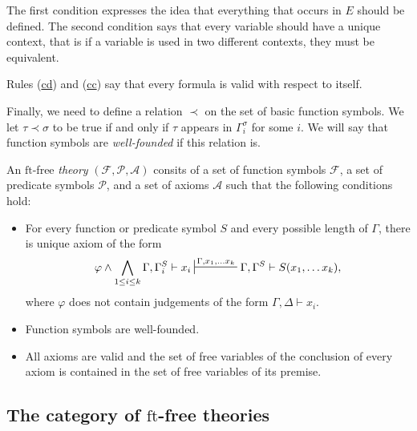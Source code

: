 \documentclass[reqno]{amsart}
\newcommand{\axref}[1]{(\hyperref[ax:#1]{#1})}
\theoremstyle{definition}
\theoremstyle{remark}
\newcommand{\fs}[1]{\mathrm{#1}}
\newcommand{\ft}{\fs{ft}}
\numberwithin{figure}{section}
\begin{document}
\begin{remark}
The first condition expresses the idea that everything that occurs in $E$ should be defined.
The second condition says that every variable should have a unique context, that is if a variable is used in two different contexts, they must be equivalent.
\end{remark}

\begin{remark}
Rules \axref{cd} and \axref{cc} say that every formula is valid with respect to itself.
\end{remark}

Finally, we need to define a relation $\prec$ on the set of basic function symbols.
We let $\tau \prec \sigma$ to be true if and only if $\tau$ appears in $\Gamma^\sigma_i$ for some $i$.
We will say that function symbols are \emph{well-founded} if this relation is.

\begin{defn}[ft-free]
An $\ft$-free \emph{theory} $(\mathcal{F},\mathcal{P},\mathcal{A})$ consits of a set of function symbols $\mathcal{F}$, a set of predicate symbols $\mathcal{P}$, and a set of axioms $\mathcal{A}$ such that the following conditions hold:
\begin{itemize}
\item For every function or predicate symbol $S$ and every possible length of $\Gamma$, there is unique axiom of the form
\[ \varphi \land \bigwedge_{1 \leq i \leq k} \Gamma, \Gamma^S_i \vdash x_i \sststile{}{\Gamma, x_1, \ldots x_k} \Gamma, \Gamma^S \vdash S(x_1, \ldots x_k), \]
where $\varphi$ does not contain judgements of the form $\Gamma, \Delta \vdash x_i$.
\item Function symbols are well-founded.
\item All axioms are valid and the set of free variables of the conclusion of every axiom is contained in the set of free variables of its premise.
\end{itemize}
\end{defn}

\subsection{The category of $\ft$-free theories}
\label{sec:types}
\end{document}
